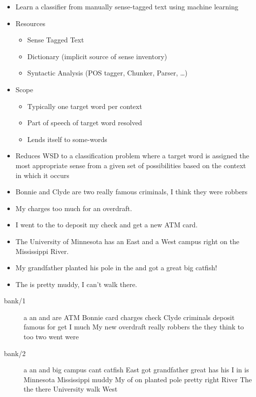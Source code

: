 \documentclass[a4paper,landscape,headrule,footrule,xetex]{foils}
\begin{document}
\begin{itemize}
\item Learn a  classifier from manually
  sense-tagged text using machine learning
\item Resources
\begin{itemize}
\item   Sense Tagged Text
\item Dictionary (implicit source of sense inventory)
\item   Syntactic Analysis (POS tagger, Chunker, Parser, \ldots)
\end{itemize}
\item Scope 
\begin{itemize}
\item Typically
  one target word per context
\item Part of speech of target word resolved
\item   Lends itself to some-words
\end{itemize}
\item Reduces WSD to a
  classification problem where a target word is assigned the most
  appropriate sense from a given set of possibilities based on the
  context in which it occurs
\end{itemize}

\begin{itemize}
\item Bonnie and Clyde are two really famous criminals, I think they were  robbers
\item My  charges too much for an overdraft.
\item I went to the  to deposit my check and get a new ATM card.
\item The University of Minnesota has an East and a West  campus right on the Mississippi River.
\item My grandfather planted his pole in the  and got a great big catfish!
\item The  is pretty muddy, I can’t walk there.
\end{itemize}


\begin{description}
\item[bank/1] a an and are ATM Bonnie card charges check Clyde criminals deposit famous for get I much My new overdraft really robbers the they think to too two went were
\item[bank/2]  
a an and big campus cant catfish East got grandfather great has his I in is Minnesota Mississippi muddy My of on planted pole pretty right River The the there University walk West
\end{description}
\end{document}
